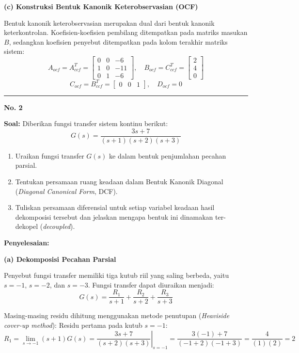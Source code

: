 \documentclass[11pt,a4paper]{article}
\begin{document}
\textbf{(c) Konstruksi Bentuk Kanonik Keterobservasian (OCF)}

Bentuk kanonik keterobservasian merupakan dual dari bentuk kanonik keterkontrolan. Koefisien-koefisien pembilang ditempatkan pada matriks masukan $B$, sedangkan koefisien penyebut ditempatkan pada kolom terakhir matriks sistem:
$$A_{ocf} = A_{ccf}^T = \begin{bmatrix} 0 & 0 & -6 \\ 1 & 0 & -11 \\ 0 & 1 & -6 \end{bmatrix}, \quad B_{ocf} = C_{ccf}^T = \begin{bmatrix} 2 \\ 4 \\ 0 \end{bmatrix}$$
$$C_{ocf} = B_{ccf}^T = \begin{bmatrix} 0 & 0 & 1 \end{bmatrix}, \quad D_{ocf} = 0$$

\vspace{12pt}
\hrule
\vspace{10pt}

\textbf{\large No. 2}

\textbf{Soal:}  
Diberikan fungsi transfer sistem kontinu berikut:
$$G(s) = \frac{3s + 7}{(s+1)(s+2)(s+3)}$$
\begin{enumerate}[label=(\alph*)]
    \item Uraikan fungsi transfer $G(s)$ ke dalam bentuk penjumlahan pecahan parsial.
    \item Tentukan persamaan ruang keadaan dalam Bentuk Kanonik Diagonal (\textit{Diagonal Canonical Form}, DCF).
    \item Tuliskan persamaan diferensial untuk setiap variabel keadaan hasil dekomposisi tersebut dan jelaskan mengapa bentuk ini dinamakan ter-dekopel (\textit{decoupled}).
\end{enumerate}

\textbf{Penyelesaian:}

\textbf{(a) Dekomposisi Pecahan Parsial}

Penyebut fungsi transfer memiliki tiga kutub riil yang saling berbeda, yaitu $s = -1$, $s = -2$, dan $s = -3$. Fungsi transfer dapat diuraikan menjadi:
$$G(s) = \frac{R_1}{s+1} + \frac{R_2}{s+2} + \frac{R_3}{s+3}$$

Masing-masing residu dihitung menggunakan metode penutupan (\textit{Heaviside cover-up method}):
Residu pertama pada kutub $s = -1$:
$$R_1 = \lim_{s \to -1} (s+1) G(s) = \left. \frac{3s + 7}{(s+2)(s+3)} \right|_{s=-1} = \frac{3(-1) + 7}{(-1+2)(-1+3)} = \frac{4}{(1)(2)} = 2$$
\end{document}
